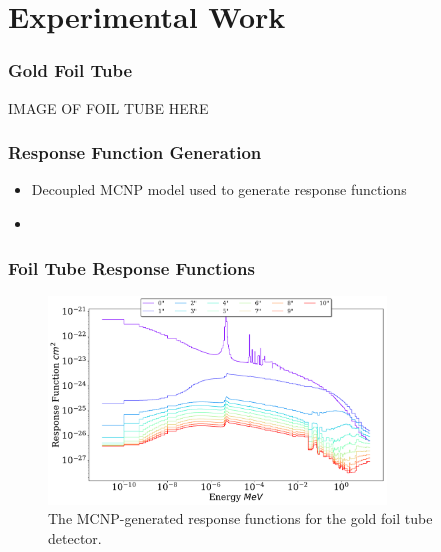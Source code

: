 \documentclass[fleqn]{beamer}
\begin{document}
\section{Experimental Work}
\begin{frame}
\frametitle{Gold Foil Tube}

IMAGE OF FOIL TUBE HERE




\end{frame}

\begin{frame}
\frametitle{Response Function Generation}

\begin{itemize}
\item Decoupled MCNP model used to generate response functions
\item 
\end{itemize}



\end{frame}

\begin{frame}
\frametitle{Foil Tube Response Functions}

\begin{figure}
\centering
\includegraphics[width = 0.8\textwidth]{ft_au}
\caption{The MCNP-generated response functions for the gold foil tube detector.}
\end{figure}

\end{frame}
\end{document}
